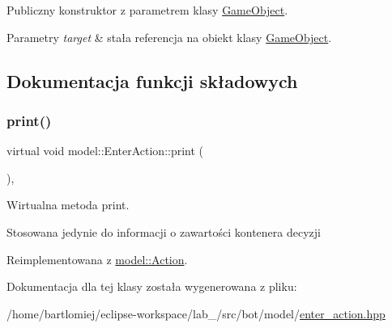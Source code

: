Publiczny konstruktor z parametrem klasy \hyperlink{classmodel_1_1GameObject}{Game\+Object}. 


\begin{DoxyParams}{Parametry}
{\em target} & stała referencja na obiekt klasy \hyperlink{classmodel_1_1GameObject}{Game\+Object}. \\
\hline
\end{DoxyParams}


\subsection{Dokumentacja funkcji składowych}
\mbox{\label{classmodel_1_1EnterAction_a0e6f49b42a1c026c421f29193670abeb}} 
\subsubsection{\texorpdfstring{print()}{print()}}
{\footnotesize\ttfamily virtual void model\+::\+Enter\+Action\+::print (\begin{DoxyParamCaption}{ }\end{DoxyParamCaption})\hspace{0.3cm}{\ttfamily [inline]}, {\ttfamily [virtual]}}



Wirtualna metoda print. 

Stosowana jedynie do informacji o zawartości kontenera decyzji 

Reimplementowana z \hyperlink{classmodel_1_1Action_a2955dbb4a69e38a48aa07d730fe2d77c}{model\+::\+Action}.



Dokumentacja dla tej klasy została wygenerowana z pliku\+:\begin{DoxyCompactItemize}
\item 
/home/bartlomiej/eclipse-\/workspace/lab\+\_/src/bot/model/\hyperlink{enter__action_8hpp}{enter\+\_\+action.\+hpp}\end{DoxyCompactItemize}
